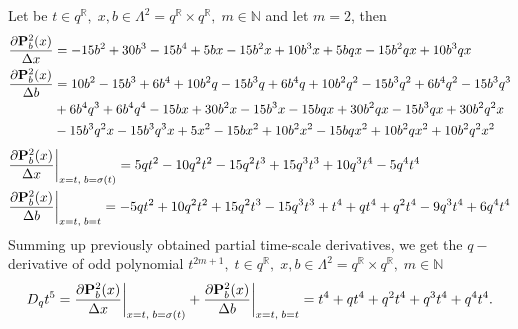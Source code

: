 \begin{examp}
    \label{time_scale_qn_example_2}
    Let be $t\in q^{\mathbb{R}}, \; x,b\in \Lambda^2 = q^{\mathbb{R}} \times q^{\mathbb{R}}, \; m\in\mathbb{N}$ and let $m=2$, then
    \begin{align*}
        \frac{\partial {\mathbf{P}}\sp{2} \sb{b}(x)}{\Delta x}
        &= -15 b^2 + 30 b^3 - 15 b^4 + 5 b x - 15 b^2 x + 10 b^3 x + 5 b q x - 15 b^2 q x + 10 b^3 q x \\
        \frac{\partial {\mathbf{P}}\sp{2} \sb{b}(x)}{\Delta b}
        &= 10 b^2 - 15 b^3 + 6 b^4 + 10 b^2 q - 15 b^3 q + 6 b^4 q
        + 10 b^2 q^2 - 15 b^3 q^2 + 6 b^4 q^2 - 15 b^3 q^3 \\
        &+ 6 b^4 q^3 + 6 b^4 q^4 - 15 b x + 30 b^2 x - 15 b^3 x - 15 b q x + 30 b^2 q x
        - 15 b^3 q x + 30 b^2 q^2 x \\
        &- 15 b^3 q^2 x - 15 b^3 q^3 x + 5 x^2 - 15 b x^2 + 10 b^2 x^2 - 15 b q x^2 + 10 b^2 q x^2 + 10 b^2 q^2 x^2
    \end{align*}
    \begin{align*}
        &\frac{\partial {\mathbf{P}}\sp{2} \sb{b}(x)}{\Delta x} \bigg |_{x = t, \; b = \sigma(t)}
        = 5 q t^2 - 10 q^2 t^2 - 15 q^2 t^3 + 15 q^3 t^3 + 10 q^3 t^4 - 5 q^4 t^4 \\
        &\frac{\partial {\mathbf{P}}\sp{2} \sb{b}(x)}{\Delta b} \bigg |_{x = t, \; b = t}
        = -5 q t^2 + 10 q^2 t^2 + 15 q^2 t^3 - 15 q^3 t^3 + t^4 + q t^4 + q^2 t^4 - 9 q^3 t^4 + 6 q^4 t^4
    \end{align*}
    Summing up previously obtained partial time-scale derivatives, we get the $q-$derivative of odd polynomial
    $t^{2m+1}, \; t\in q^{\mathbb{R}}, \; x,b\in \Lambda^2 = q^{\mathbb{R}} \times q^{\mathbb{R}}, \; m\in\mathbb{N}$
    \[
        D_{q} t^{5}
        = \frac{\partial {\mathbf{P}}\sp{2} \sb{b}(x)}{\Delta x} \bigg |_{x = t, \; b = \sigma(t)}
        + \frac{\partial {\mathbf{P}}\sp{2} \sb{b}(x)}{\Delta b} \bigg |_{x = t, \; b = t}
        = t^4 + q t^4 + q^2 t^4 + q^3 t^4 + q^4 t^4.
    \]
\end{examp}